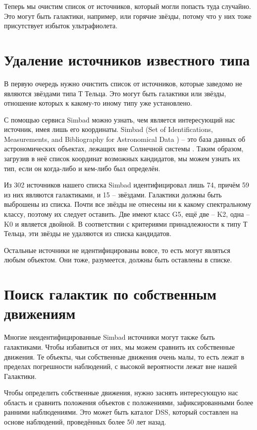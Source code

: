 Теперь мы очистим список от источников, который могли попасть туда случайно. Это могут быть галактики, например, или горячие звёзды, потому что у них тоже присутствует избыток ультрафиолета.

\section{Удаление источников известного типа}
В первую очередь нужно очистить список от источников, которые заведомо не являются звёздами типа Т Тельца. Это могут быть галактики или звёзды, отношение которых к какому-то иному типу уже установлено.

С помощью сервиса Simbad можно узнать, чем является интересующий нас источник, имея лишь его координаты. Simbad (Set of Identifications, Measurements, and Bibliography for Astronomical Data ) -- это база данных об астрономических объектах, лежащих вне Солнечной системы \cite{wenger2000simbad}. Таким образом, загрузив в неё список координат возможных кандидатов, мы можем узнать их тип, если он когда-либо и кем-либо был определён.

Из 302 источников нашего списка Simbad идентифицировал лишь 74, причём 59 из них являются галактиками, и 15 -- звёздами. Галактики должны быть выброшены из списка. Почти все звёзды не отнесены ни к какому спектральному классу, поэтому их следует оставить. Две имеют класс G5, ещё две -- K2, одна -- K0 и является двойной. В соответствии с критериями принадлежности к типу Т Тельца, эти звёзды не удаляются из списка кандидатов.

Остальные источники не идентифицированы вовсе, то есть могут являться любым объектом. Они тоже, разумеется, должны быть оставлены в списке.

\section{Поиск галактик по собственным движениям}
Многие неидентифицированные Simbad источники могут также быть галактиками. Чтобы избавиться от них, мы можем сравнить их собственные движения. Те объекты, чьи собственные движения очень малы, то есть лежат в пределах погрешности наблюдений, с высокой вероятности лежат вне нашей Галактики.

Чтобы определить собственные движения, нужно заснять интересующую нас область и сравнить положения объектов с положениями, зафиксированными более ранними наблюдениями. Это может быть каталог DSS, который составлен на основе наблюдений, проведённых более 50 лет назад.

